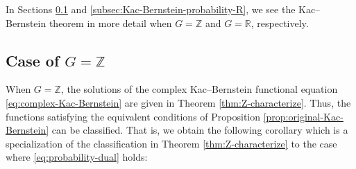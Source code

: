 \documentclass[12pt]{article}
\theoremstyle{definition}
\theoremstyle{remark}
\numberwithin{equation}{section}
\numberwithin{figure}{section}
\numberwithin{table}{section}
\begin{document}
In Sections \ref{subsec:Kac-Bernstein-probability-Z} and \ref{subsec:Kac-Bernstein-probability-R}, we see the Kac--Bernstein theorem in more detail when $ G = \mathbb{ Z } $ and $ G = \mathbb{ R } $, respectively.

\subsection{Case of \texorpdfstring{$ G = \mathbb{ Z } $}{G = Z}}
\label{subsec:Kac-Bernstein-probability-Z}

When $ G = \mathbb{ Z } $, the solutions of the complex Kac--Bernstein functional equation \eqref{eq:complex-Kac-Bernstein} are given in Theorem \ref{thm:Z-characterize}.
Thus, the functions satisfying the equivalent conditions of Proposition \ref{prop:original-Kac-Bernstein} can be classified.
That is, we obtain the following corollary which is a specialization of the classification in Theorem \ref{thm:Z-characterize} to the case where \eqref{eq:probability-dual} holds:
\end{document}
